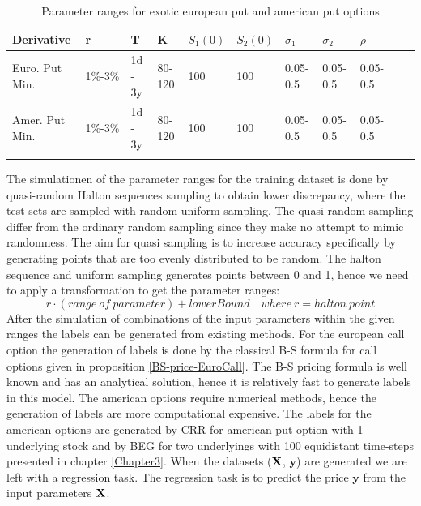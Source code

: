 \begin{table}[th]
\caption[Parameter Ranges For MLPs]{Parameter ranges for exotic european put and american put options}
\label{tab:ExoticParRange}
\centering
\begin{tabular}{l l l l l l l l l l l}
\toprule
\textbf{Derivative} & \textbf{r} & \textbf{T} & K & $S_1(0)$ & $S_2(0)$ & $\sigma_1$ & $\sigma_2$ & $\rho$ \\
\midrule
Euro. Put Min. & 1\%-3\% & 1d - 3y & 80-120 & 100 & 100 & 0.05-0.5 & 0.05-0.5 & 0.05-0.5\\ 
Amer. Put Min. & 1\%-3\% & 1d - 3y & 80-120 & 100 & 100 & 0.05-0.5 & 0.05-0.5 & 0.05-0.5\\
\bottomrule\\
\end{tabular}
\end{table}

The simulationen of the parameter ranges for the training dataset is done by quasi-random Halton sequences sampling to obtain lower discrepancy, where the test sets are sampled with random uniform sampling. The quasi random sampling differ from the ordinary random sampling since they make no attempt to mimic randomness. The aim for quasi sampling is to increase accuracy specifically by generating points that are too evenly distributed to be random. The halton sequence and uniform sampling generates points between 0 and 1, hence we need to apply a transformation to get the parameter ranges:
$$r \cdot (range \ of \ parameter) + lowerBound \quad where \ r=halton \ point$$
After the simulation of combinations of the input parameters within the given ranges the labels can be generated from existing methods. For the european call option the generation of labels is done by the classical B-S formula for call options given in proposition \ref{BS-price-EuroCall}. The B-S pricing formula is well known and has an analytical solution, hence it is relatively fast to generate labels in this model. The american options require numerical methods, hence the generation of labels are more computational expensive. The labels for the american options are generated by CRR for american put option with 1 underlying stock and by BEG for two underlyings with 100 equidistant time-steps presented in chapter \ref{Chapter3}. When the datasets ($\mathbf{X}$, $\bm{y}$) are generated we are left with a regression task. The regression task is to predict the price $\bm{y}$ from the input parameters $\mathbf{X}$.\\ 

